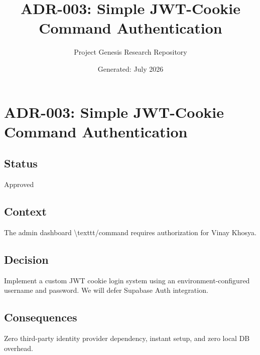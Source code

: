 \documentclass[11pt,a4paper]{article}
\title{\textbf{ADR-003: Simple JWT-Cookie Command Authentication}}
\author{Project Genesis Research Repository}
\date{\small Generated: July 2026}
\begin{document}
\maketitle
\thispagestyle{empty}

\newpage
\section*{ADR-003: Simple JWT-Cookie Command Authentication}

\subsection*{Status}
Approved

\subsection*{Context}
The admin dashboard \textbackslash{}texttt{/command} requires authorization for Vinay Khosya.

\subsection*{Decision}
Implement a custom JWT cookie login system using an environment-configured username and password. We will defer Supabase Auth integration.

\subsection*{Consequences}
Zero third-party identity provider dependency, instant setup, and zero local DB overhead.
\end{document}
